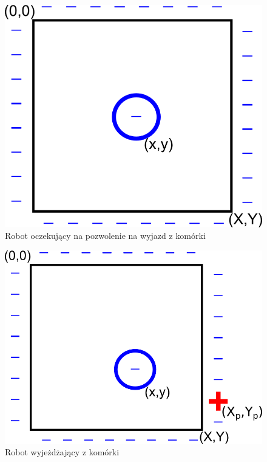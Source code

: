 	\begin{figure}[H]
		\centering
		\includegraphics[scale=0.9]{img/waiting.png}
		\caption{Robot oczekujący na pozwolenie na wyjazd z komórki}
		\label{pic:waiting}
	\end{figure}
	\begin{figure}[H]
		\centering
		\includegraphics[scale=0.9]{img/moving.png}
		\caption{Robot wyjeżdżający z komórki}
		\label{pic:moving}
	\end{figure}
